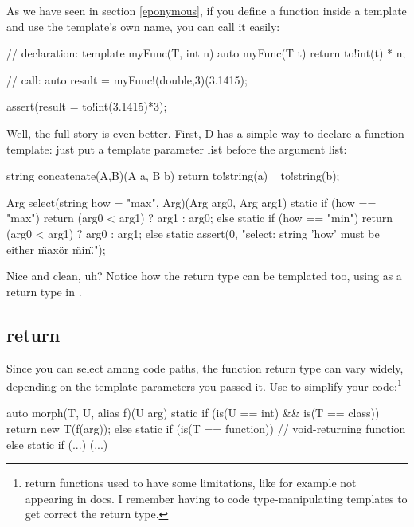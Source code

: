 As we have seen in section \ref{eponymous}, if you define a function inside a template and use the template's own name, you can call it easily:

\begin{dcode}
// declaration:
template myFunc(T, int n)
{
    auto myFunc(T t) { return to!int(t) * n;}
}

// call:
auto result = myFunc!(double,3)(3.1415);

assert(result = to!int(3.1415)*3);
\end{dcode}

Well, the full story is even better. First, D has a simple way to declare a function template: just put a template parameter list before the argument list:

\begin{dcode}
string concatenate(A,B)(A a, B b)
{
    return to!string(a) ~ to!string(b);
}

Arg select(string how = "max", Arg)(Arg arg0, Arg arg1)
{
    static if (how == "max")
        return (arg0 < arg1) ? arg1 : arg0;
    else static if (how == "min")
        return (arg0 < arg1) ? arg0 : arg1;
    else
        static assert(0, 
        "select: string 'how' must be either \"max\" or \"min\".");
}      
\end{dcode}

Nice and clean, uh? Notice how the return type can be templated too, using  as a return type in . 

\subsection{\texorpdfstring{ return}
                           {auto return}}
\label{autoreturn}

Since you can select among code paths, the function return type can vary widely, depending on the template parameters you passed it. Use  to simplify your code:\footnote{  return functions used to have some limitations, like for example not appearing in docs. I remember having to code type-manipulating templates to get correct the return type.}

\begin{dcode}
auto morph(T, U, alias f)(U arg)
{
    static if (is(U == int) && is(T == class))
    {
        return new T(f(arg));
    }
    else static if (is(T == function))
    {} // void-returning function
    else static if (...)
    (...)
}
\end{dcode}

